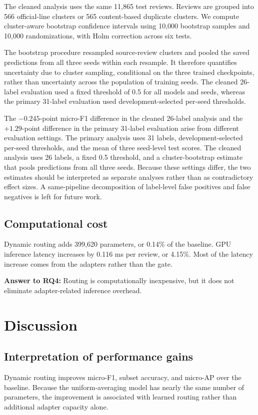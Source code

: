 \documentclass[review,12pt]{elsarticle}
\begin{document}
The cleaned analysis uses the same 11,865 test reviews. Reviews are grouped into 566 official-line clusters or 565 content-based duplicate clusters. We compute cluster-aware bootstrap confidence intervals using 10,000 bootstrap samples and 10,000 randomizations, with Holm correction across six tests.

The bootstrap procedure resampled source-review clusters and pooled the saved predictions from all three seeds within each resample. It therefore quantifies uncertainty due to cluster sampling, conditional on the three trained checkpoints, rather than uncertainty across the population of training seeds. The cleaned 26-label evaluation used a fixed threshold of 0.5 for all models and seeds, whereas the primary 31-label evaluation used development-selected per-seed thresholds.

The $-0.245$-point micro-F1 difference in the cleaned 26-label analysis and the $+1.29$-point difference in the primary 31-label evaluation arise from different evaluation settings. The primary analysis uses 31 labels, development-selected per-seed thresholds, and the mean of three seed-level test scores. The cleaned analysis uses 26 labels, a fixed 0.5 threshold, and a cluster-bootstrap estimate that pools predictions from all three seeds. Because these settings differ, the two estimates should be interpreted as separate analyses rather than as contradictory effect sizes. A same-pipeline decomposition of label-level false positives and false negatives is left for future work.

\subsection{Computational cost}
Dynamic routing adds 399,620 parameters, or 0.14\% of the baseline. GPU inference latency increases by 0.116 ms per review, or 4.15\%. Most of the latency increase comes from the adapters rather than the gate.

\textbf{Answer to RQ4:} Routing is computationally inexpensive, but it does not eliminate adapter-related inference overhead.

\section{Discussion}

\subsection{Interpretation of performance gains}
Dynamic routing improves micro-F1, subset accuracy, and micro-AP over the baseline. Because the uniform-averaging model has nearly the same number of parameters, the improvement is associated with learned routing rather than additional adapter capacity alone.
\end{document}

